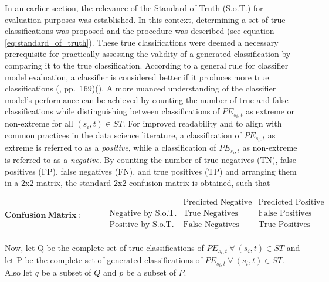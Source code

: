 \documentclass[
  12pt,
]{article}
\begin{document}
In an earlier section, the relevance of the Standard of Truth (S.o.T.)
for evaluation purposes was established. In this context, determining a
set of true classifications was proposed and the procedure was described
(see equation \ref{eq:standard_of_truth}). These true classifications
were deemed a necessary prerequisite for practically assessing the
validity of a generated classification by comparing it to the true
classification. According to a general rule for classifier model
evaluation, a classifier is considered better if it produces more true
classifications (\cite{Hosmer.2013}, pp.~169)(\cite{Zumel.2014}). A more
nuanced understanding of the classifier model's performance can be
achieved by counting the number of true and false classifications while
distinguishing between classifications of \(PE_{s_{i},t}\) as extreme or
non-extreme for all \((s_{i},t)\in ST\). For improved readability and to
align with common practices in the data science literature, a
classification of \(PE_{s_{i},t}\) as extreme is referred to as a
\textit{positive}, while a classification of \(PE_{s_{i},t}\) as
non-extreme is referred to as a \textit{negative}. By counting the
number of true negatives (TN), false positives (FP), false negatives
(FN), and true positives (TP) and arranging them in a 2x2 matrix, the
standard 2x2 confusion matrix is obtained, such that

\begin{equation}
\mathbf{Confusion\:Matrix} := \qquad
\begin{array}{c|c|c|}
& \text{Predicted Negative} & \text{Predicted Positive} \\
\hline
\text{Negative by S.o.T.} & \text{True Negatives} & \text{False Positives} \\
\hline
\text{Positive by S.o.T.} & \text{False Negatives} & \text{True Positives} \\
\end{array}
\end{equation} \vspace{0.5cm}

Now, let Q be the complete set of true classifications of
\(PE_{s_{i},t}\:\forall\:(s_{i},t)\in ST\) and let P be the complete set
of generated classifications of
\(PE_{s_{i},t}\:\forall\:(s_{i},t)\in ST\). Also let \(q\) be a subset
of \(Q\) and \(p\) be a subset of \(P\).\newline {}

\vspace{-1cm}
\end{document}

